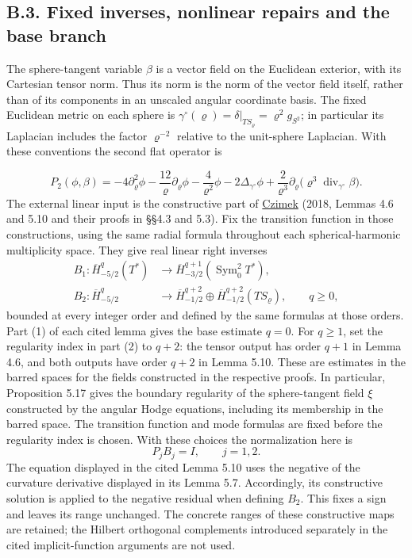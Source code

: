 \documentclass[
  english,
  11pt,
  reqno]{amsart}
\begin{document}
\subsection{B.3. Fixed inverses, nonlinear repairs and the base
branch}\label{b.3.-fixed-inverses-nonlinear-repairs-and-the-base-branch}\label{sec:online-extension-linear-and-base}

The sphere-tangent variable \(\beta\) is a vector field on the Euclidean
exterior, with its Cartesian tensor norm. Thus its norm is the norm of
the vector field itself, rather than of its components in an unscaled
angular coordinate basis. The fixed Euclidean metric on each sphere is
\(\gamma^\circ(\varrho)=\delta|_{TS_\varrho}=\varrho^2g_{S^2}\); in
particular its Laplacian includes the factor \(\varrho^{-2}\) relative
to the unit-sphere Laplacian. With these conventions the second flat
operator is

\label{eq:online-extension-scalar-flat-operator} \[
P_2(\phi,\beta)
=-4\partial_\varrho^2\phi
-\frac{12}{\varrho}\partial_\varrho\phi
-\frac{4}{\varrho^2}\phi
-2\Delta_{\gamma^\circ}\phi
+\frac{2}{\varrho^3}\partial_\varrho
  \bigl(\varrho^3\operatorname{div}_{\gamma^\circ}\beta\bigr).
\] The external linear input is the constructive part of
\hyperref[ref-Czimek2018]{Czimek} (2018, Lemmas 4.6 and 5.10 and their
proofs in §§4.3 and 5.3). Fix the transition function in those
constructions, using the same radial formula throughout each
spherical-harmonic multiplicity space. They give real linear right
inverses \[
\begin{aligned}
B_1:\overline H^{q}_{-5/2}(T^*)
&\longrightarrow
\overline H^{q+1}_{-3/2}(\operatorname{Sym}^2_0T^*),\\
B_2:\overline H^{q}_{-5/2}
&\longrightarrow
\overline H^{q+2}_{-1/2}\oplus
\overline H^{q+2}_{-1/2}(TS_\varrho),
\qquad q\ge0,
\end{aligned}
\] bounded at every integer order and defined by the same formulas at
those orders. Part (1) of each cited lemma gives the base estimate
\(q=0\). For \(q\ge1\), set the regularity index in part (2) to \(q+2\):
the tensor output has order \(q+1\) in Lemma 4.6, and both outputs have
order \(q+2\) in Lemma 5.10. These are estimates in the barred spaces
for the fields constructed in the respective proofs. In particular,
Proposition 5.17 gives the boundary regularity of the sphere-tangent
field \(\xi\) constructed by the angular Hodge equations, including its
membership in the barred space. The transition function and mode
formulas are fixed before the regularity index is chosen. With these
choices the normalization here is \[
P_jB_j=I,\qquad j=1,2.
\] The equation displayed in the cited Lemma 5.10 uses the negative of
the curvature derivative displayed in its Lemma 5.7. Accordingly, its
constructive solution is applied to the negative residual when defining
\(B_2\). This fixes a sign and leaves its range unchanged. The concrete
ranges of these constructive maps are retained; the Hilbert orthogonal
complements introduced separately in the cited implicit-function
arguments are not used.
\end{document}
